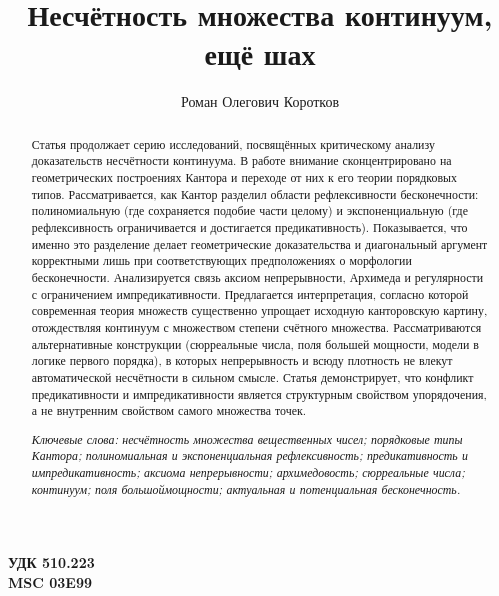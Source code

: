 \documentclass[12pt]{article}
\title{Несчётность множества континуум, ещё шах}
\author{Роман Олегович Коротков}
\begin{document}

\begin{flushleft}
{\bf УДК 510.223 }\\{\bf MSC 03E99 }
\end{flushleft}

{\let\newpage\relax\maketitle}

\begin{abstract}

Статья продолжает серию исследований, посвящённых критическому анализу доказательств несчётности континуума. В работе внимание сконцентрировано на геометрических построениях Кантора и переходе от них к его теории порядковых типов. Рассматривается, как Кантор разделил области рефлексивности бесконечности: полиномиальную (где сохраняется подобие части целому) и экспоненциальную (где рефлексивность ограничивается и достигается предикативность). Показывается, что именно это разделение делает геометрические доказательства и диагональный аргумент корректными лишь при соответствующих предположениях о морфологии бесконечности. Анализируется связь аксиом непрерывности, Архимеда и регулярности с ограничением импредикативности. Предлагается интерпретация, согласно которой современная теория множеств существенно упрощает исходную канторовскую картину, отождествляя континуум с множеством степени счётного множества. Рассматриваются альтернативные конструкции (сюрреальные числа, поля большей мощности, модели в логике первого порядка), в которых непрерывность и всюду плотность не влекут автоматической несчётности в сильном смысле. Статья демонстрирует, что конфликт предикативности и импредикативности является структурным свойством упорядочения, а не внутренним свойством самого множества точек.

{\it Ключевые слова: несчётность множества вещественных чисел; порядковые типы Кантора; полиномиальная и экспоненциальная рефлексивность; предикативность и импредикативность; аксиома непрерывности; архимедовость; сюрреальные числа; континуум; поля большоймощности; актуальная и потенциальная бесконечность.}

\end{abstract}

\end{document}
